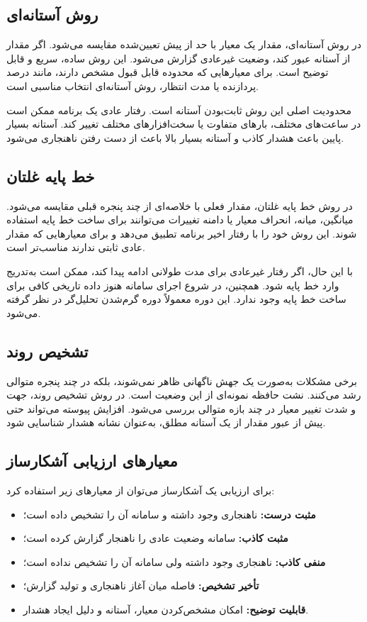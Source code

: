 \subsection{روش آستانه‌ای}

در روش آستانه‌ای، مقدار یک معیار با حد از پیش تعیین‌شده مقایسه می‌شود. اگر مقدار
از آستانه عبور کند، وضعیت غیرعادی گزارش می‌شود. این روش ساده، سریع و قابل توضیح
است. برای معیارهایی که محدوده قابل قبول مشخص دارند، مانند درصد پردازنده یا مدت
انتظار، روش آستانه‌ای انتخاب مناسبی است.

محدودیت اصلی این روش ثابت‌بودن آستانه است. رفتار عادی یک برنامه ممکن است در
ساعت‌های مختلف، بارهای متفاوت یا سخت‌افزارهای مختلف تغییر کند. آستانه بسیار
پایین باعث هشدار کاذب و آستانه بسیار بالا باعث از دست رفتن ناهنجاری می‌شود.

\subsection{خط پایه غلتان}

در روش خط پایه غلتان، مقدار فعلی با خلاصه‌ای از
چند پنجره قبلی مقایسه می‌شود. میانگین، میانه، انحراف معیار یا دامنه تغییرات
می‌توانند برای ساخت خط پایه استفاده شوند. این روش خود را با رفتار اخیر برنامه
تطبیق می‌دهد و برای معیارهایی که مقدار عادی ثابتی ندارند مناسب‌تر است.

با این حال، اگر رفتار غیرعادی برای مدت طولانی ادامه پیدا کند، ممکن است به‌تدریج
وارد خط پایه شود. همچنین، در شروع اجرای سامانه هنوز داده تاریخی کافی برای ساخت
خط پایه وجود ندارد. این دوره معمولاً دوره گرم‌شدن تحلیل‌گر در نظر گرفته می‌شود.

\subsection{تشخیص روند}

برخی مشکلات به‌صورت یک جهش ناگهانی ظاهر نمی‌شوند، بلکه در چند پنجره متوالی رشد
می‌کنند. نشت حافظه نمونه‌ای از این وضعیت است. در روش تشخیص روند، جهت و شدت تغییر
معیار در چند بازه متوالی بررسی می‌شود. افزایش پیوسته می‌تواند حتی پیش از عبور
مقدار از یک آستانه مطلق، به‌عنوان نشانه هشدار شناسایی شود.

\subsection{معیارهای ارزیابی آشکارساز}

برای ارزیابی یک آشکارساز می‌توان از معیارهای زیر استفاده کرد:

\begin{itemize}
    \item \textbf{مثبت درست:} ناهنجاری وجود داشته و سامانه آن را تشخیص داده است؛
    \item \textbf{مثبت کاذب:} سامانه وضعیت عادی را ناهنجار گزارش کرده است؛
    \item \textbf{منفی کاذب:} ناهنجاری وجود داشته ولی سامانه آن را تشخیص نداده
    است؛
    \item \textbf{تأخیر تشخیص:} فاصله میان آغاز ناهنجاری و تولید گزارش؛
    \item \textbf{قابلیت توضیح:} امکان مشخص‌کردن معیار، آستانه و دلیل ایجاد
    هشدار.
\end{itemize}

